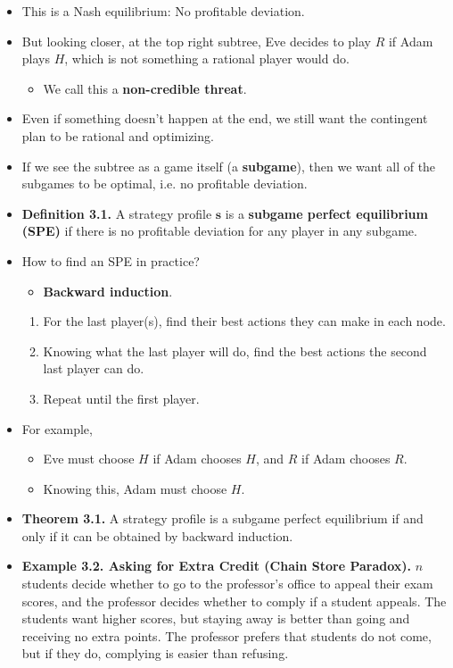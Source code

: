 \documentclass[notitlepage]{article}
\begin{document}
\begin{itemize}
    \item This is a Nash equilibrium: No profitable deviation.
    \item But looking closer, at the top right subtree, Eve decides to play \(R\) if Adam plays \(H\), which is not something a rational player would do.
    \begin{itemize}
        \item We call this a \textbf{non-credible threat}.
    \end{itemize}
    \item Even if something doesn't happen at the end, we still want the contingent plan to be rational and optimizing.
    \item If we see the subtree as a game itself (a \textbf{subgame}), then we want all of the subgames to be optimal, i.e. no profitable deviation.
    \item \textbf{Definition 3.1.} A strategy profile \(\mathbf{s}\) is a \textbf{subgame perfect equilibrium (SPE)} if there is no profitable deviation for any player in any subgame.
    \item How to find an SPE in practice?
    \begin{itemize}
        \item \textbf{Backward induction}.
    \end{itemize}
    \begin{enumerate}
        \item For the last player(s), find their best actions they can make in each node.
        \item Knowing what the last player will do, find the best actions the second last player can do.
        \item Repeat until the first player.
    \end{enumerate}
    \item For example,
    \begin{itemize}
        \item Eve must choose \(H\) if Adam chooses \(H\), and \(R\) if Adam chooses \(R\).
        \item Knowing this, Adam must choose \(H\).
    \end{itemize}
    \item \textbf{Theorem 3.1.} A strategy profile is a subgame perfect equilibrium if and only if it can be obtained by backward induction.
    \item \textbf{Example 3.2. Asking for Extra Credit (Chain Store Paradox).} \(n\) students decide whether to go to the professor's office to appeal their exam scores, and the professor decides whether to comply if a student appeals. The students want higher scores, but staying away is better than going and receiving no extra points. The professor prefers that students do not come, but if they do, complying is easier than refusing.


\end{itemize}
\end{document}
